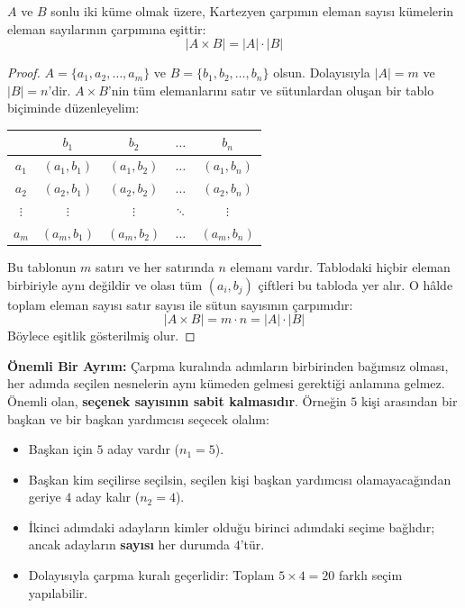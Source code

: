 \begin{theorem}
$A$ ve $B$ sonlu iki küme olmak üzere, Kartezyen çarpımın eleman sayısı kümelerin eleman sayılarının çarpımına eşittir:
\[ |A \times B| = |A| \cdot |B| \]
\end{theorem}
\begin{proof}
$A = \{a_1, a_2, \dots, a_m\}$ ve $B = \{b_1, b_2, \dots, b_n\}$ olsun. Dolayısıyla $|A| = m$ ve $|B| = n$'dir. $A \times B$'nin tüm elemanlarını satır ve sütunlardan oluşan bir tablo biçiminde düzenleyelim:
\begin{center}
\begin{tabular}{c|cccc}
 & $b_1$ & $b_2$ & $\dots$ & $b_n$ \\
\midrule
$a_1$ & $(a_1, b_1)$ & $(a_1, b_2)$ & $\dots$ & $(a_1, b_n)$ \\
$a_2$ & $(a_2, b_1)$ & $(a_2, b_2)$ & $\dots$ & $(a_2, b_n)$ \\
$\vdots$ & $\vdots$ & $\vdots$ & $\ddots$ & $\vdots$ \\
$a_m$ & $(a_m, b_1)$ & $(a_m, b_2)$ & $\dots$ & $(a_m, b_n)$ \\
\end{tabular}
\end{center}
Bu tablonun $m$ satırı ve her satırında $n$ elemanı vardır. Tablodaki hiçbir eleman birbiriyle aynı değildir ve olası tüm $(a_i, b_j)$ çiftleri bu tabloda yer alır. O hâlde toplam eleman sayısı satır sayısı ile sütun sayısının çarpımıdır:
\[ |A \times B| = m \cdot n = |A| \cdot |B| \]
Böylece eşitlik gösterilmiş olur.
\end{proof}

\textbf{Önemli Bir Ayrım:} Çarpma kuralında adımların birbirinden bağımsız olması, her adımda seçilen nesnelerin aynı kümeden gelmesi gerektiği anlamına gelmez. Önemli olan, \textbf{seçenek sayısının sabit kalmasıdır}. Örneğin $5$ kişi arasından bir başkan ve bir başkan yardımcısı seçecek olalım:
\begin{itemize}
  \item Başkan için $5$ aday vardır ($n_1 = 5$).
  \item Başkan kim seçilirse seçilsin, seçilen kişi başkan yardımcısı olamayacağından geriye $4$ aday kalır ($n_2 = 4$).
  \item İkinci adımdaki adayların kimler olduğu birinci adımdaki seçime bağlıdır; ancak adayların \textbf{sayısı} her durumda $4$'tür.
  \item Dolayısıyla çarpma kuralı geçerlidir: Toplam $5 \times 4 = 20$ farklı seçim yapılabilir.
\end{itemize}

